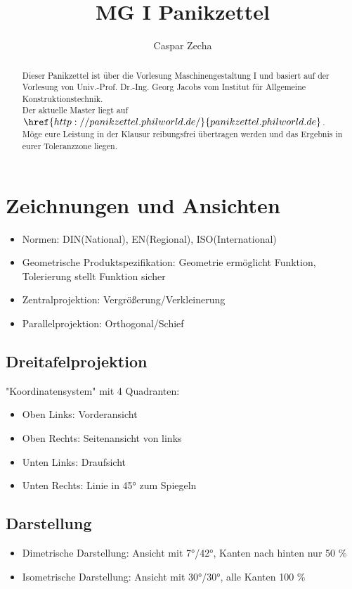 \documentclass[a4paper,DIV=15,fontsize=11pt]{scrartcl}
\title{MG I Panikzettel}
\author{Caspar Zecha}
\begin{document}
	
\maketitle
	
\begin{abstract}
	Dieser Panikzettel ist über die Vorlesung Maschinengestaltung I und basiert auf der Vorlesung von Univ.-Prof. Dr.-Ing. Georg Jacobs vom Institut für Allgemeine Konstruktionstechnik.\\
	Der aktuelle Master liegt auf $\href{http://panikzettel.philworld.de/}{panikzettel.philworld.de}$.\\
	Möge eure Leistung in der Klausur reibungsfrei übertragen werden und das Ergebnis in eurer Toleranzzone liegen.\\
\end{abstract}
	
\tableofcontents
	
\section{Zeichnungen und Ansichten}
\begin{itemize}
	\item Normen: DIN(National), EN(Regional), ISO(International)
	\item Geometrische Produktspezifikation: Geometrie ermöglicht Funktion, Tolerierung stellt Funktion sicher
	\item Zentralprojektion: Vergrößerung/Verkleinerung
	\item Parallelprojektion: Orthogonal/Schief
\end{itemize}
	
\subsection{Dreitafelprojektion}
"Koordinatensystem" mit 4 Quadranten:
\begin{itemize}
	\item Oben Links: Vorderansicht
	\item Oben Rechts: Seitenansicht von links
	\item Unten Links: Draufsicht
	\item Unten Rechts: Linie in 45° zum Spiegeln
\end{itemize}
	
\subsection{Darstellung}
\begin{itemize}
	\item Dimetrische Darstellung: Ansicht mit 7°/42°, Kanten nach hinten nur 50 \%
	\item Isometrische Darstellung: Ansicht mit 30°/30°, alle Kanten 100 \%
\end{itemize}
	
\end{document}
